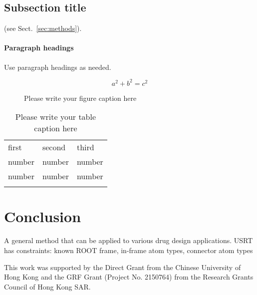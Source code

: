 \documentclass[twocolumn]{svjour3}          %
\begin{document}
\subsection{Subsection title}
\label{sec:2}

(see Sect.~\ref{sec:methods}).

\paragraph{Paragraph headings} Use paragraph headings as needed.

\begin{equation}
a^2+b^2=c^2
\end{equation}

\begin{figure*}
\caption{Please write your figure caption here}
\label{fig:2}
\end{figure*}

\begin{table}
\caption{Please write your table caption here}
\label{tab:1}
\begin{tabular}{lll}
\hline\noalign{\smallskip}
first & second & third  \\
\noalign{\smallskip}\hline\noalign{\smallskip}
number & number & number \\
number & number & number \\
\noalign{\smallskip}\hline
\end{tabular}
\end{table}

\section{Conclusion}

A general method that can be applied to various drug design applications.
USRT has constraints: known ROOT frame, in-frame atom types, connector atom types

\begin{acknowledgements}

This work was supported by the Direct Grant from the Chinese University of Hong Kong and the GRF Grant (Project No. 2150764) from the Research Grants Council of Hong Kong SAR.

\end{acknowledgements}

\end{document}
